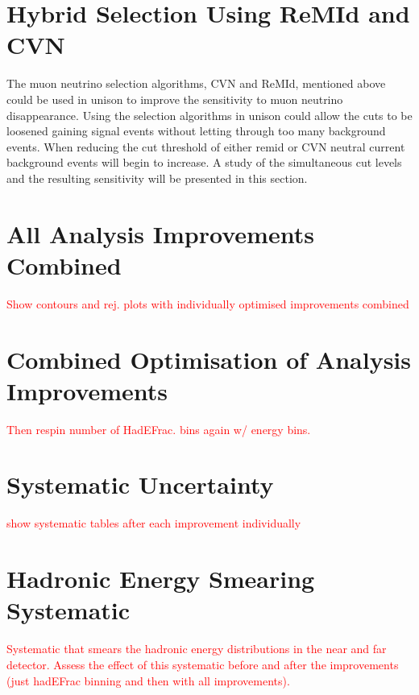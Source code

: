 \section{Hybrid Selection Using ReMId and CVN}

The muon neutrino selection algorithms, CVN and ReMId, mentioned above
could be used in unison to improve the sensitivity to muon neutrino
disappearance. Using the selection algorithms in unison could allow
the cuts to be loosened gaining signal events without letting through
too many background events. 
When reducing the cut threshold of either remid or CVN neutral current
background events will begin to increase. A study of the
simultaneous cut levels and the resulting sensitivity will be
presented in this section. 



\section{All Analysis Improvements Combined}
\textcolor{red}{Show contours and rej. plots with individually
  optimised improvements combined }

\section{Combined Optimisation of Analysis Improvements}
\textcolor{red}{Then respin number of HadEFrac. bins again w/ energy
  bins. } 



\section{Systematic Uncertainty}

\textcolor{red}{show systematic tables after each improvement individually}



\section{Hadronic Energy Smearing Systematic}

\textcolor{red}{Systematic that smears the hadronic energy
  distributions in the near 
and far detector. Assess the effect of this systematic before and
after the improvements (just hadEFrac binning and then with all
improvements).}


